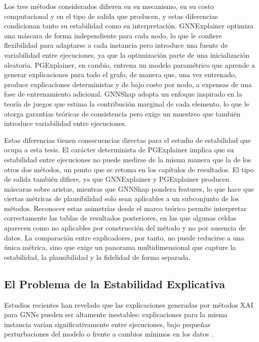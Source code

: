 Los tres métodos considerados difieren en su mecanismo, en su costo computacional y en el tipo de salida que producen, y estas diferencias condicionan tanto su estabilidad como su interpretación. GNNExplainer optimiza una máscara de forma independiente para cada nodo, lo que le confiere flexibilidad para adaptarse a cada instancia pero introduce una fuente de variabilidad entre ejecuciones, ya que la optimización parte de una inicialización aleatoria. PGExplainer, en cambio, entrena un modelo paramétrico que aprende a generar explicaciones para todo el grafo, de manera que, una vez entrenado, produce explicaciones deterministas y de bajo costo por nodo, a expensas de una fase de entrenamiento adicional. GNNShap adopta un enfoque inspirado en la teoría de juegos que estima la contribución marginal de cada elemento, lo que le otorga garantías teóricas de consistencia pero exige un muestreo que también introduce variabilidad entre ejecuciones.

Estas diferencias tienen consecuencias directas para el estudio de estabilidad que ocupa a esta tesis. El carácter determinista de PGExplainer implica que su estabilidad entre ejecuciones no puede medirse de la misma manera que la de los otros dos métodos, un punto que se retoma en los capítulos de resultados. El tipo de salida también difiere, ya que GNNExplainer y PGExplainer producen máscaras sobre aristas, mientras que GNNShap pondera features, lo que hace que ciertas métricas de plausibilidad solo sean aplicables a un subconjunto de los métodos. Reconocer estas asimetrías desde el marco teórico permite interpretar correctamente las tablas de resultados posteriores, en las que algunas celdas aparecen como no aplicables por construcción del método y no por ausencia de datos. La comparación entre explicadores, por tanto, no puede reducirse a una única métrica, sino que exige un panorama multidimensional que capture la estabilidad, la plausibilidad y la fidelidad de forma separada.

\subsection{El Problema de la Estabilidad Explicativa}

Estudios recientes han revelado que las explicaciones generadas por métodos XAI para GNNs pueden ser altamente inestables: explicaciones para la misma instancia varían significativamente entre ejecuciones, bajo pequeñas perturbaciones del modelo o frente a cambios mínimos en los datos \cite{Gawantka2024AExplanations, Agarwal2022ProbingMethods, Kosan2023GNNX-BENCH:Benchmarking}.

